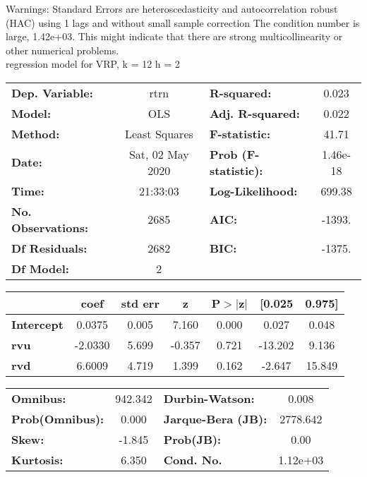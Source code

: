 Warnings: \newline
 [1] Standard Errors are heteroscedasticity and autocorrelation robust (HAC) using 1 lags and without small sample correction \newline
 [2] The condition number is large, 1.42e+03. This might indicate that there are \newline
 strong multicollinearity or other numerical problems.\\ 

regression model for VRP, k = 12 h = 2\begin{center}
\begin{tabular}{lclc}
\toprule
\textbf{Dep. Variable:}    &       rtrn       & \textbf{  R-squared:         } &     0.023   \\
\textbf{Model:}            &       OLS        & \textbf{  Adj. R-squared:    } &     0.022   \\
\textbf{Method:}           &  Least Squares   & \textbf{  F-statistic:       } &     41.71   \\
\textbf{Date:}             & Sat, 02 May 2020 & \textbf{  Prob (F-statistic):} &  1.46e-18   \\
\textbf{Time:}             &     21:33:03     & \textbf{  Log-Likelihood:    } &    699.38   \\
\textbf{No. Observations:} &        2685      & \textbf{  AIC:               } &    -1393.   \\
\textbf{Df Residuals:}     &        2682      & \textbf{  BIC:               } &    -1375.   \\
\textbf{Df Model:}         &           2      & \textbf{                     } &             \\
\bottomrule
\end{tabular}
\begin{tabular}{lcccccc}
                   & \textbf{coef} & \textbf{std err} & \textbf{z} & \textbf{P$> |$z$|$} & \textbf{[0.025} & \textbf{0.975]}  \\
\midrule
\textbf{Intercept} &       0.0375  &        0.005     &     7.160  &         0.000        &        0.027    &        0.048     \\
\textbf{rvu}       &      -2.0330  &        5.699     &    -0.357  &         0.721        &      -13.202    &        9.136     \\
\textbf{rvd}       &       6.6009  &        4.719     &     1.399  &         0.162        &       -2.647    &       15.849     \\
\bottomrule
\end{tabular}
\begin{tabular}{lclc}
\textbf{Omnibus:}       & 942.342 & \textbf{  Durbin-Watson:     } &    0.008  \\
\textbf{Prob(Omnibus):} &   0.000 & \textbf{  Jarque-Bera (JB):  } & 2778.642  \\
\textbf{Skew:}          &  -1.845 & \textbf{  Prob(JB):          } &     0.00  \\
\textbf{Kurtosis:}      &   6.350 & \textbf{  Cond. No.          } & 1.12e+03  \\
\bottomrule
\end{tabular}
\end{center}

